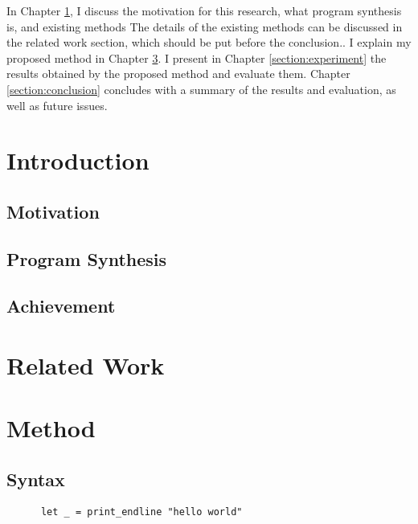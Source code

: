 \documentclass[12pt, a4paper, titlepage]{report}
\begin{document}
In Chapter \ref{section:introduction}, I discuss the motivation for this research, what program synthesis is, and existing methods  The details of the existing methods can be discussed in the related work section, which should be  put before the conclusion..
I explain my proposed method in Chapter \ref{section:method}.
I present in Chapter \ref{section:experiment} the results obtained by the proposed method and evaluate them.
Chapter \ref{section:conclusion} concludes with a summary of the results and evaluation, as well as future issues.

\chapter{Introduction} \label{section:introduction}
 
  \section{Motivation}
    \cite{bodik:2015}
  \section{Program Synthesis}
    \cite{gulwani:2017}
  \section{Achievement} %

\chapter{Related Work}

\chapter{Method}\label{section:method}
  \section{Syntax}
    \begin{verbatim}
      let _ = print_endline "hello world"
    \end{verbatim}
\end{document}
